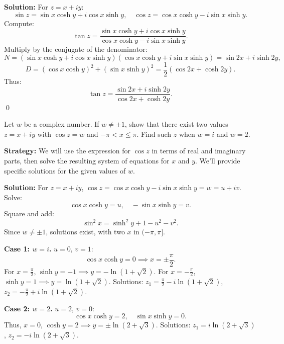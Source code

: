 \bigskip\noindent\textbf{Solution:}
For \( z = x + iy \):
\[
\sin z = \sin x \cosh y + i \cos x \sinh y, \quad \cos z = \cos x \cosh y - i \sin x \sinh y.
\]
Compute:
\[
\tan z = \frac{\sin x \cosh y + i \cos x \sinh y}{\cos x \cosh y - i \sin x \sinh y}.
\]
Multiply by the conjugate of the denominator:
\[
N = (\sin x \cosh y + i \cos x \sinh y)(\cos x \cosh y + i \sin x \sinh y) = \sin 2x + i \sinh 2y,
\]
\[
D = (\cos x \cosh y)^2 + (\sin x \sinh y)^2 = \frac{1}{2}(\cos 2x + \cosh 2y).
\]
Thus:
\[
\tan z = \frac{\sin 2x + i \sinh 2y}{\cos 2x + \cosh 2y}.
\]\qed


\begin{problembox}
Let \( w \) be a complex number. If \( w \ne \pm 1 \), show that there exist two values \( z = x + iy \) with \( \cos z = w \) and \( -\pi < x \leq \pi \). Find such \( z \) when \( w = i \) and \( w = 2 \).
\end{problembox}

\noindent\textbf{Strategy:} We will use the expression for $\cos z$ in terms of real and imaginary parts, then solve the resulting system of equations for $x$ and $y$. We'll provide specific solutions for the given values of $w$.

\bigskip\noindent\textbf{Solution:}
For \( z = x + iy \), \( \cos z = \cos x \cosh y - i \sin x \sinh y = w = u + iv \). Solve:
\[
\cos x \cosh y = u, \quad -\sin x \sinh y = v.
\]
Square and add:
\[
\sin^2 x = \sinh^2 y + 1 - u^2 - v^2.
\]
Since \( w \neq \pm 1 \), solutions exist, with two \( x \) in \( (-\pi, \pi] \).

\textbf{Case 1: \( w = i \).} \( u = 0 \), \( v = 1 \):
\[
\cos x \cosh y = 0 \implies x = \pm \frac{\pi}{2}.
\]
For \( x = \frac{\pi}{2} \), \( \sinh y = -1 \implies y = -\ln(1 + \sqrt{2}) \).
For \( x = -\frac{\pi}{2} \), \( \sinh y = 1 \implies y = \ln(1 + \sqrt{2}) \).
Solutions: \( z_1 = \frac{\pi}{2} - i \ln(1 + \sqrt{2}) \), \( z_2 = -\frac{\pi}{2} + i \ln(1 + \sqrt{2}) \).

\textbf{Case 2: \( w = 2 \).} \( u = 2 \), \( v = 0 \):
\[
\cos x \cosh y = 2, \quad \sin x \sinh y = 0.
\]
Thus, \( x = 0 \), \( \cosh y = 2 \implies y = \pm \ln(2 + \sqrt{3}) \).
Solutions: \( z_1 = i \ln(2 + \sqrt{3}) \), \( z_2 = -i \ln(2 + \sqrt{3}) \).

